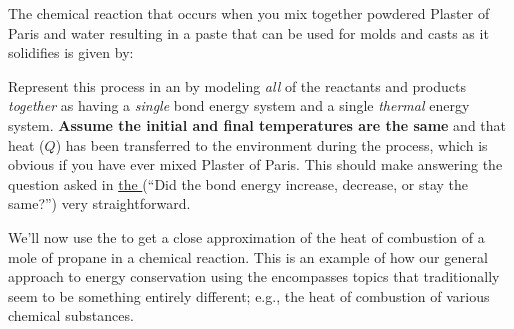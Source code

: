 \noindent The chemical reaction that occurs when you mix together powdered Plaster of Paris and water resulting in a paste that can be used for molds and casts as it solidifies is given by:			
\begin{center}
\end{center}
Represent this process in an \EnergyDiagram{} by modeling {\em all} of the reactants and products {\em together} as having a {\em single} bond energy system and a single {\em thermal} energy system. \textbf{Assume the initial and final temperatures are the same} and that heat ($Q$) has been transferred to the environment during the process, which is obvious if you have ever mixed Plaster of Paris. This should make answering the question asked in \hyperref[\FNT1.1.4-1]{the \FNT} (``Did the bond energy increase, decrease, or stay the same?'') very straightforward.


\WCD 

\begin{FNTenv}
	
\end{FNTenv}

\noindent
We'll now use the \EnergyInteractionModel{} to get a close approximation of the heat of combustion of a mole of propane in a chemical reaction. This is an example of how our general approach to energy conservation using the \textbf{\EnergyInteractionModel{}} encompasses topics that traditionally seem to be something entirely different; e.g., the heat of combustion of various chemical substances.

